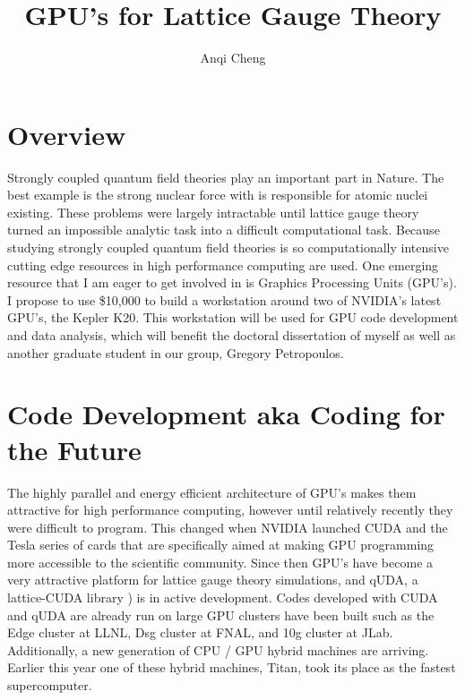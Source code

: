 \documentclass[11pt]{article}
\begin{document}
  \title{GPU's for Lattice Gauge Theory}
  \author{Anqi Cheng}
  \maketitle

  \section*{Overview} %
  Strongly coupled quantum field theories play an important part in Nature.
  The best example is the strong nuclear force with is responsible for atomic nuclei existing.
  These problems were largely intractable until lattice gauge theory turned an impossible analytic task into a difficult computational task.
  Because studying strongly coupled quantum field theories is so computationally intensive cutting edge resources in high performance computing are used.
  One emerging resource that I am eager to get involved in is Graphics Processing Units (GPU's).   
  I propose to use \$10,000 to build a workstation around two of NVIDIA's latest GPU's, the Kepler K20.  
  This workstation will be used for GPU code development and data analysis, which will benefit the doctoral dissertation of myself as well as another 
  graduate student in our group, Gregory Petropoulos. 
  
  \section*{Code Development aka Coding for the Future} %
  The highly parallel and energy efficient architecture of GPU's makes them attractive for high performance computing, however until relatively recently they were difficult to program.
  This changed when NVIDIA launched CUDA and the Tesla series of cards that are specifically aimed at making GPU programming more accessible to the scientific community.
  Since then GPU's have become a very attractive platform for lattice gauge theory simulations, and qUDA, a lattice-CUDA library \cite{QUDA1,QUDA2,QUDA3}) is in active development.
  Codes developed with CUDA and qUDA are already run on large GPU clusters have been built such as the Edge cluster at LLNL, Dsg cluster at FNAL, and 10g cluster at JLab.
  Additionally, a new generation of CPU / GPU hybrid machines are arriving.
  Earlier this year one of these hybrid machines, Titan, took its place as the fastest supercomputer.
  
\end{document}
